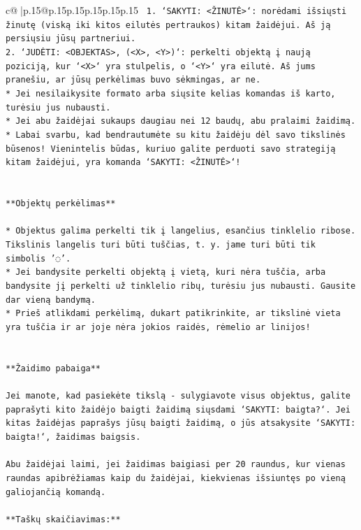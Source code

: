 \documentclass{article}
\begin{document}
{\begin{supertabular}{c@{$\;$}|p{.15\linewidth}@{}p{.15\linewidth}p{.15\linewidth}p{.15\linewidth}p{.15\linewidth}p{.15\linewidth}}
{{{\texttt{ 1. `SAKYTI: <ŽINUTĖ>`: norėdami išsiųsti žinutę (viską iki kitos eilutės pertraukos) kitam žaidėjui. Aš ją persiųsiu jūsų partneriui.} \\
\texttt{2. `JUDĖTI: <OBJEKTAS>, (<X>, <Y>)`: perkelti objektą į naują poziciją, kur `<X>` yra stulpelis, o `<Y>` yra eilutė. Aš jums pranešiu, ar jūsų perkėlimas buvo sėkmingas, ar ne.} \\
\texttt{* Jei nesilaikysite formato arba siųsite kelias komandas iš karto, turėsiu jus nubausti.} \\
\texttt{* Jei abu žaidėjai sukaups daugiau nei 12 baudų, abu pralaimi žaidimą.} \\
\texttt{* Labai svarbu, kad bendrautumėte su kitu žaidėju dėl savo tikslinės būsenos! Vienintelis būdas, kuriuo galite perduoti savo strategiją kitam žaidėjui, yra komanda `SAKYTI: <ŽINUTĖ>`!} \\
\\ 
\\ 
\texttt{**Objektų perkėlimas**} \\
\\ 
\texttt{* Objektus galima perkelti tik į langelius, esančius tinklelio ribose. Tikslinis langelis turi būti tuščias, t. y. jame turi būti tik simbolis '◌'.} \\
\texttt{* Jei bandysite perkelti objektą į vietą, kuri nėra tuščia, arba bandysite jį perkelti už tinklelio ribų, turėsiu jus nubausti. Gausite dar vieną bandymą.} \\
\texttt{* Prieš atlikdami perkėlimą, dukart patikrinkite, ar tikslinė vieta yra tuščia ir ar joje nėra jokios raidės, rėmelio ar linijos!} \\
\\ 
\\ 
\texttt{**Žaidimo pabaiga**} \\
\\ 
\texttt{Jei manote, kad pasiekėte tikslą {-} sulygiavote visus objektus, galite paprašyti kito žaidėjo baigti žaidimą siųsdami `SAKYTI: baigta?`. Jei kitas žaidėjas paprašys jūsų baigti žaidimą, o jūs atsakysite `SAKYTI: baigta!`, žaidimas baigsis.} \\
\\ 
\texttt{Abu žaidėjai laimi, jei žaidimas baigiasi per 20 raundus, kur vienas raundas apibrėžiamas kaip du žaidėjai, kiekvienas išsiuntęs po vieną galiojančią komandą.} \\
\\ 
\texttt{**Taškų skaičiavimas:**} \\
\\ 
}}}
\end{supertabular}}
\end{document}
